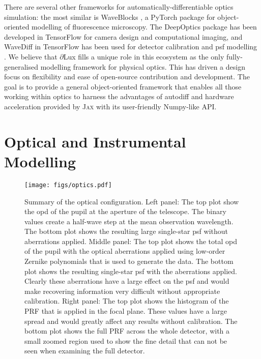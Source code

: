 \documentclass[]{spieman}
\newcommand\jax{\textsc{Jax}\xspace}
\newcommand\dlux{$\partial$Lux\xspace}
\begin{document}
There are several other frameworks for automatically-differentiable optics simulation:
the most similar is WaveBlocks \cite{page2020}, a PyTorch package for object-oriented modelling of fluorescence microscopy. 
The DeepOptics package \cite{sitzmann2018} has been developed in TensorFlow for camera design and computational imaging, and
WaveDiff in TensorFlow has been used for detector calibration \cite{liaudat2021} and \ac{psf} modelling \cite{Liaudat2022}. 
We believe that \dlux fills a unique role in this ecosystem as the only fully-generalised modelling framework for physical optics. This has driven a design focus on flexibility and ease of open-source contribution and development. The goal is to provide a general object-oriented framework that enables all those working within optics to harness the advantages of autodiff and hardware acceleration provided by \jax with its user-friendly Numpy-like API.






\section{Optical and Instrumental Modelling}
\label{sec:simulation}

\begin{figure*}
    \centering
    \texttt{[image: figs/optics.pdf]}
    \caption{Summary of the optical configuration. Left panel: The top plot show the \ac{opd} of the pupil at the aperture of the telescope. The binary values create a half-wave step at the mean observation wavelength. The bottom plot shows the resulting large single-star \ac{psf} without aberrations applied. Middle panel: The top plot shows the total \ac{opd} of the pupil with the optical aberrations applied using low-order Zernike polynomials that is used to generate the data. The bottom plot shows the resulting single-star \ac{psf} with the aberrations applied. Clearly these aberrations have a large effect on the \ac{psf} and would make recovering information very difficult without appropriate calibration. Right panel: The top plot shows the histogram of the PRF that is applied in the focal plane. These values have a large spread and would greatly affect any results without calibration. The bottom plot shows the full PRF across the whole detector, with a small zoomed region used to show the fine detail that can not be seen when examining the full detector.}
    \label{fig:optics}
\end{figure*}
\end{document}
